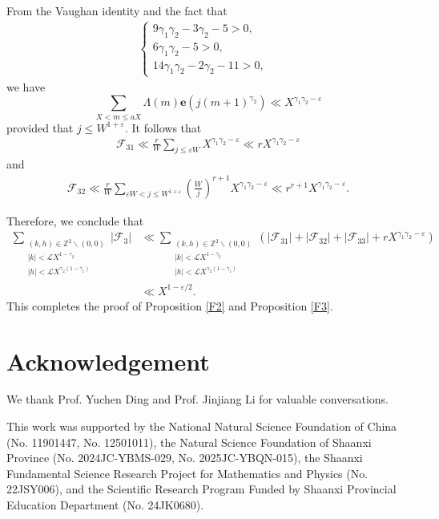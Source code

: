 \documentclass[12pt, reqno, twoside, letterpaper]{amsart}
\numberwithin{equation}{section}
\newcommand{\cF}{\ensuremath{\mathcal{F}}}
\newcommand{\cL}{\ensuremath{\mathcal{L}}}
\newcommand{\ZZ}{\ensuremath{\mathbb{Z}}}
\theoremstyle{customthm}
\theoremstyle{customrem}
\begin{document}
From the Vaughan identity and the fact that
\begin{align}\label{eq: condition 1}
\left\{\begin{array}{ll}
9\gamma_1\gamma_2-3\gamma_2-5>0, & \\
6\gamma_1\gamma_2-5>0, & \\
14\gamma_1\gamma_2-2\gamma_2-11>0, &
\end{array}\right.
\end{align}
we have
$$
\sum_{X < m \leqslant aX}\Lambda(m)\mathbf{e}\left(j(m+1)^{\gamma_2}\right)
\ll X^{\gamma_1\gamma_2-\varepsilon}
$$
provided that $j\leqslant W^{1+\varepsilon}$. It follows that
\begin{align*}
\cF_{31}\ll \frac{r}{W}\sum_{j\leqslant \varepsilon W}
X^{\gamma_1\gamma_2-\varepsilon}\ll rX^{\gamma_1\gamma_2-\varepsilon}
\end{align*}
and
\begin{align*}
\cF_{32}\ll\frac{r}{W}\sum_{\varepsilon W<j\leqslant W^{1+\varepsilon}}
\left(\frac{W}{j}\right)^{r+1}X^{\gamma_1\gamma_2-\varepsilon}
\ll r^{r+1} X^{\gamma_1\gamma_2-\varepsilon}.
\end{align*}

Therefore, we conclude that
\begin{align}\label{eq: bound for F3}
\sum_{\substack{(k,h) \in \ZZ^2 \backslash (0,0) \\ |k|<\cL X^{1-\gamma_2} \\ |h|<\cL X^{\gamma_2(1-\gamma_1)}}}|\cF_3|
&\ll \sum_{\substack{(k,h) \in \ZZ^2 \backslash (0,0) \\ |k|<\cL X^{1-\gamma_2} \\ |h|<\cL X^{\gamma_2(1-\gamma_1)}}}\left(|\cF_{31}|+|\cF_{32}|+|\cF_{33}|
+rX^{\gamma_1\gamma_2-\varepsilon}\right)\nonumber\\
&\ll X^{1-\varepsilon/2}.
\end{align}
This completes the proof of Proposition \ref{F2} and Proposition \ref{F3}.








\section*{Acknowledgement}
We thank Prof. Yuchen Ding and Prof. Jinjiang Li for valuable conversations. 

This work was supported by the National Natural Science Foundation of China (No. 11901447, No. 12501011),
the Natural Science Foundation of Shaanxi Province (No. 2024JC-YBMS-029, No. 2025JC-YBQN-015),
the Shaanxi Fundamental Science Research Project for Mathematics and Physics (No. 22JSY006),
and the Scientific Research Program Funded by Shaanxi Provincial Education Department (No. 24JK0680).
\end{document}
